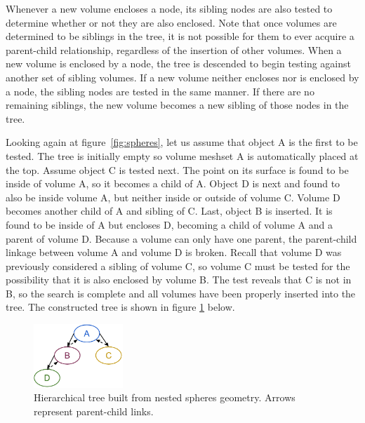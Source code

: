 \documentclass{anstrans}
\begin{document}
Whenever a new volume encloses a node, its sibling nodes are also tested to
determine whether or not they are also enclosed.  Note that once volumes are
determined to be siblings in the tree, it is not possible for them to ever
acquire a parent-child relationship, regardless of the insertion of other
volumes.  When a new volume is enclosed by a node, the tree is descended to
begin testing against another set of sibling volumes.  If a new volume neither
encloses nor is enclosed by a node, the sibling nodes are tested in the same
manner.  If there are no remaining siblings, the new volume becomes a new
sibling of those nodes in the tree.

Looking again at figure~\ref{fig:spheres}, let us assume that object A is the
first to be tested. The tree is initially empty so volume meshset A is
automatically placed at the top.  Assume object C is tested next.  The point
on its surface is found to be inside of volume A, so it becomes a child of A.
Object D is next and found to also be inside volume A, but neither inside or
outside of volume C.  Volume D becomes another child of A and sibling of C.
Last, object B is inserted. It is found to be inside of A but encloses D,
becoming a child of volume A and a parent of volume D. Because a volume can
only have one parent, the parent-child linkage between volume A and volume D
is broken.  Recall that volume D was previously considered a sibling of volume C,
so volume C must be tested for the possibility that it is also enclosed by
volume B. The test reveals that C is not in B, so the search is complete and all
volumes have been properly inserted into the tree.  
The constructed tree is shown in figure \ref{fig:tree} below.

\begin{figure}[ht] %
  \centering
  \includegraphics[width=0.3\textwidth]{../figs/tree.png}
  \caption{Hierarchical tree built from nested spheres geometry.  Arrows represent parent-child links.}
  \label{fig:tree}
\end{figure}
\end{document}
